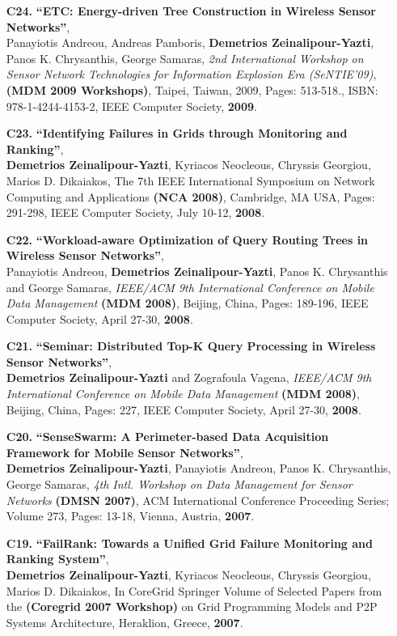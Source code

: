 \documentclass[10pt]{article}
\begin{document}
\begin{enumerate}
\item[{\bf C24.}]
\label{C24}
{\bf ``ETC: Energy-driven Tree Construction in Wireless Sensor Networks''}, \\
Panayiotis Andreou, Andreas Pamboris, {\bf Demetrios Zeinalipour-Yazti}, Panos K. Chrysanthis, George Samaras,  
{\em 2nd International Workshop on Sensor Network Technologies for Information Explosion Era (SeNTIE'09)}, 
{\bf (MDM 2009 Workshops)}, Taipei, Taiwan, 2009, Pages: 513-518., ISBN: 978-1-4244-4153-2, 
IEEE Computer Society, {\bf 2009}.  

\item[{\bf C23.}]
\label{C23}
{\bf ``Identifying Failures in Grids through Monitoring and Ranking''}, \\
{\bf Demetrios Zeinalipour-Yazti}, Kyriacos Neocleous, Chryssis Georgiou, Marios D. Dikaiakos, 
The 7th IEEE International Symposium on Network Computing and Applications {\bf (NCA 2008)},
Cambridge, MA USA, Pages: 291-298, IEEE Computer Society, July  10-12, {\bf 2008}.

\item[{\bf C22.}]
\label{C22}
{\bf ``Workload-aware Optimization of Query Routing Trees in Wireless Sensor Networks''}, \\
Panayiotis Andreou, {\bf Demetrios Zeinalipour-Yazti}, Panos K. Chrysanthis and George Samaras,
{\em IEEE/ACM 9th International Conference on Mobile Data Management} {\bf (MDM 2008)},
Beijing, China, Pages: 189-196, IEEE Computer Society, April 27-30, {\bf 2008}.

\item[{\bf C21.}]
\label{C21}
{\bf ``Seminar: Distributed Top-K Query Processing in Wireless Sensor Networks''}, \\
{\bf Demetrios Zeinalipour-Yazti} and Zografoula Vagena,
{\em IEEE/ACM 9th International Conference on Mobile Data Management} {\bf (MDM 2008)},
Beijing, China, Pages: 227, IEEE Computer Society, April 27-30, {\bf 2008}.

\item[{\bf C20.}]
\label{C20}
{\bf ``SenseSwarm: A Perimeter-based Data Acquisition Framework for Mobile Sensor Networks''}, \\
{\bf Demetrios Zeinalipour-Yazti}, Panayiotis Andreou, Panos K. Chrysanthis, George Samaras,
{\em 4th Intl. Workshop on Data Management for Sensor Networks}
{\bf (DMSN 2007)}, ACM International Conference Proceeding Series; Volume 273,
Pages: 13-18, Vienna, Austria, {\bf 2007}.  

\item[{\bf C19.}]
\label{C19}
{\bf ``FailRank: Towards a Unified Grid Failure Monitoring and Ranking System''}, \\
{\bf Demetrios Zeinalipour-Yazti}, Kyriacos Neocleous, Chryssis Georgiou, Marios D. Dikaiakos, 
In CoreGrid Springer Volume of Selected Papers from the {\bf (Coregrid 2007 Workshop)}
on Grid Programming Models and P2P Systems Architecture, Heraklion, Greece, {\bf 2007}.


\end{enumerate}
\end{document}
